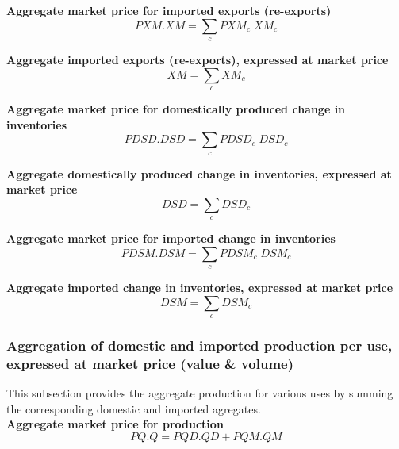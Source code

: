 \documentclass[12pt]{article}
\numberwithin{equation}{section}
\begin{document}
\noindent\textbf{Aggregate market price for imported exports (re-exports)} \\
\begin{dmath}
PXM . XM = \sum_{c} PXM_{c} \; XM_{c}
\end{dmath}

\noindent\textbf{Aggregate imported exports (re-exports), expressed at market price} \\
\begin{dmath}
XM = \sum_{c} XM_{c}
\end{dmath}

\noindent\textbf{Aggregate market price for domestically produced change in inventories} \\
\begin{dmath}
PDSD . DSD = \sum_{c} PDSD_{c} \; DSD_{c}
\end{dmath}

\noindent\textbf{Aggregate domestically produced change in inventories, expressed at market price} \\
\begin{dmath}
DSD = \sum_{c} DSD_{c}
\end{dmath}

\noindent\textbf{Aggregate market price for imported change in inventories} \\
\begin{dmath}
PDSM . DSM = \sum_{c} PDSM_{c} \; DSM_{c}
\end{dmath}

\noindent\textbf{Aggregate imported change in inventories, expressed at market price} \\
\begin{dmath}
DSM = \sum_{c} DSM_{c}
\end{dmath}




\subsubsection{Aggregation of domestic and imported production per use, expressed at market price (value \& volume)}



This subsection provides the aggregate production for various uses by summing the corresponding domestic and imported agregates. \\

\noindent\textbf{Aggregate market price for production} \\
\begin{dmath}
PQ . Q = PQD . QD + PQM . QM
\end{dmath}
\end{document}
